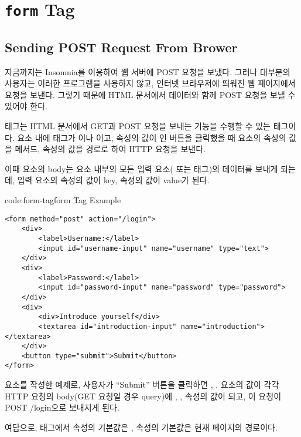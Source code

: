 \section{\texttt{form} Tag}\label{sect:form-tag}

\subsection*{Sending POST Request From Brower}

지금까지는 Insomnia를 이용하여 웹 서버에 POST 요청을 보냈다. 그러나 대부분의 사용자는 이러한 프로그램을 사용하지 않고, 인터넷 브라우저에 띄워진 웹 페이지에서 요청을 보낸다. 그렇기 때문에 HTML 문서에서  데이터와 함께 POST 요청을 보낼 수 있어야 한다.

 태그는 HTML 문서에서 GET과 POST 요청을 보내는 기능을 수행할 수 있는 태그이다.  요소 내에 태그가 이나 이고,  속성의 값이 인 버튼을 클릭했을 때  요소의  속성의 값을 메서드,  속성의 값을 경로로 하여 HTTP 요청을 보낸다.

이때  요소의 body는 요소 내부의 모든 입력 요소( 또는  태그)의 데이터를 보내게 되는데, 입력 요소의  속성의 값이 key,  속성의 값이 value가 된다.

\begin{codeenv}{code:form-tag}{form Tag Example}\begin{verbatim}
<form method="post" action="/login">
    <div>
        <label>Username:</label>
        <input id="username-input" name="username" type="text">
    </div>
    <div>
        <label>Password:</label>
        <input id="password-input" name="password" type="password">
    </div>
    <div>
        <div>Introduce yourself</div>
        <textarea id="introduction-input" name="introduction"></textarea>
    </div>
    <button type="submit">Submit</button>
</form>
\end{verbatim}
\end{codeenv}

\는  요소를 작성한 예제로, 사용자가 ``Submit'' 버튼을 클릭하면 , ,  요소의  값이 각각 HTTP 요청의 body(GET 요청일 경우 query)에 , ,  속성의 값이 되고, 이 요청이 POST /login으로 보내지게 된다.

여담으로,  태그에서  속성의 기본값은 ,  속성의 기본값은 현재 페이지의 경로이다.
